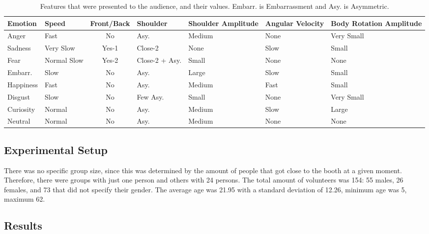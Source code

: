 \begin{table}[tbh]
\begin{center}
\small
\caption{Features that were presented to the audience, and their values. Embarr. is Embarrassment and Asy. is Asymmetric.}
\label{table:features}
\begin{tabular}{|p{1.5 cm}|p{1.5 cm}|c|p{1.5 cm}|p{1.6 cm}|p{1.6 cm}|m{1.5 cm}|}
\hline 
\textbf{Emotion} & \textbf{Speed} & \textbf{Front/Back} & \textbf{Shoulder} & \textbf{Shoulder Amplitude} & \textbf{Angular Velocity} & \textbf{Body Rotation Amplitude} \\ 
\hline
Anger & Fast & No & Asy. & Medium & None & Very Small \\
\hline
Sadness & Very Slow & Yes-1 & Close-2 & None & Slow & Small \\
\hline
Fear & Normal Slow & Yes-2 & Close-2 + Asy. & Small & None & None \\ 
\hline
Embarr. & Slow & No & Asy. & Large & Slow & Small \\
\hline
Happiness & Fast & No & Asy. & Medium & Fast & Small \\
\hline
Disgust & Slow & No & Few Asy. & Small & None & Very Small \\
\hline
Curiosity & Normal & No & Asy. & Medium & Slow & Large \\
\hline
Neutral & Normal & No & Asy. & Medium & None & None \\
\hline
\end{tabular}
\end{center}
\vspace{-0.5cm}
\end{table} 

\subsection{Experimental Setup}

There was no specific group size, since this was determined by the amount of people that got close to the booth at a given moment. Therefore, there were groups with just one person and others with 24 persons. The total amount of volunteers was 154: 55 males, 26 females, and 73 that did not specify their gender. The average age was 21.95 with a standard deviation of 12.26, minimum age was 5, maximum 62.

\subsection{Results}

